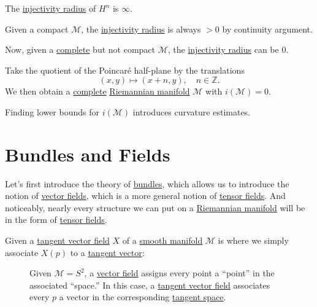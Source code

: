 \begin{eg}
	The \hyperref[def:injectivity-radius]{injectivity radius} of \(H^n\) is \(\infty \).
\end{eg}

\begin{remark}
	Given a compact \(\mathcal{M} \), the \hyperref[def:injectivity-radius]{injectivity radius} is always \(> 0\) by continuity argument.
\end{remark}

Now, given a \hyperref[def:geodesically-complete]{complete} but not compact \(\mathcal{M} \), the \hyperref[def:injectivity-radius]{injectivity radius} can be \(0\).

\begin{eg}
	Take the quotient of the Poincaré half-plane by the translations
	\[
		(x, y) \mapsto (x+n, y),\quad n\in \mathbb{Z} .
	\]
	We then obtain a \hyperref[def:geodesically-complete]{complete} \hyperref[def:Riemannian-manifold]{Riemannian manifold} \(\mathcal{M} \) with \(i(\mathcal{M} ) = 0\).
\end{eg}

\begin{note}
	Finding lower bounds for \(i(\mathcal{M})\) introduces curvature estimates.
\end{note}

\section{Bundles and Fields}
Let's first introduce the theory of \hyperref[def:bundle]{bundles}, which allows us to introduce the notion of \hyperref[def:vector-field]{vector fields}, which is a more general notion of \hyperref[def:tensor-field]{tensor fields}. And noticeably, nearly every structure we can put on a \hyperref[def:Riemannian-manifold]{Riemannian manifold} will be in the form of \hyperref[def:tensor-field]{tensor fields}.

\begin{eg}
	Given a \hyperref[def:vector-field]{tangent vector field} \(X\) of a \hyperref[def:smooth-manifold]{smooth manifold} \(\mathcal{M} \) is where we simply associate \(X(p)\) to a \hyperref[def:tangent-vector]{tangent vector}:
	\begin{figure}[H]
		\centering
		\caption{Given \(\mathcal{M} = S^2\), a \hyperref[def:vector-field*]{vector field} assigns every point a ``point'' in the associated ``space.'' In this case, a \hyperref[def:vector-field]{tangent vector field} associates every \(p\) a vector in the corresponding \hyperref[def:tangent-space]{tangent space}.}
		\label{fig:motivation-bundle-field}
	\end{figure}
\end{eg}

